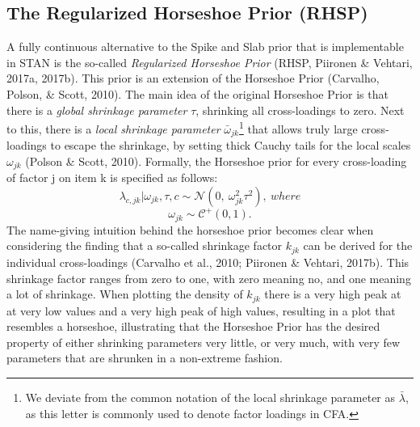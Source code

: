 \documentclass[
  man, donotrepeattitle,floatsintext]{apa6}
\begin{document}
\hypertarget{the-regularized-horseshoe-prior-rhsp}{%
\subsection{The Regularized Horseshoe Prior (RHSP)}\label{the-regularized-horseshoe-prior-rhsp}}

A fully continuous alternative to the Spike and Slab prior that is implementable in STAN is the so-called \emph{Regularized Horseshoe Prior} (RHSP, Piironen \& Vehtari, 2017a, 2017b). This prior is an extension of the Horseshoe Prior (Carvalho, Polson, \& Scott, 2010). The main idea of the original Horseshoe Prior is that there is a \emph{global shrinkage parameter} \(\tau\), shrinking all cross-loadings to zero. Next to this, there is a \emph{local shrinkage parameter} \(\bar{\omega}_{jk}\)\footnote{We deviate from the common notation of the local shrinkage parameter as \(\bar{\lambda}\), as this letter is commonly used to denote factor loadings in CFA.} that allows truly large cross-loadings to escape the shrinkage, by setting thick Cauchy tails for the local scales \(\omega_{jk}\) (Polson \& Scott, 2010). Formally, the Horseshoe prior for every cross-loading of factor j on item k is specified as follows:
\[\lambda_{c,jk} | \omega_{jk}, \tau, c\sim \mathcal{N}(0, \ \omega^2_{jk} \tau^2), \ where\]
\[\omega_{jk} \sim \mathcal{C^+}(0, 1).\]
The name-giving intuition behind the horseshoe prior becomes clear when considering the finding that a so-called shrinkage factor \(k_{jk}\) can be derived for the individual cross-loadings (Carvalho et al., 2010; Piironen \& Vehtari, 2017b). This shrinkage factor ranges from zero to one, with zero meaning no, and one meaning a lot of shrinkage. When plotting the density of \(k_{jk}\) there is a very high peak at at very low values and a very high peak of high values, resulting in a plot that resembles a horseshoe, illustrating that the Horseshoe Prior has the desired property of either shrinking parameters very little, or very much, with very few parameters that are shrunken in a non-extreme fashion.
\end{document}
